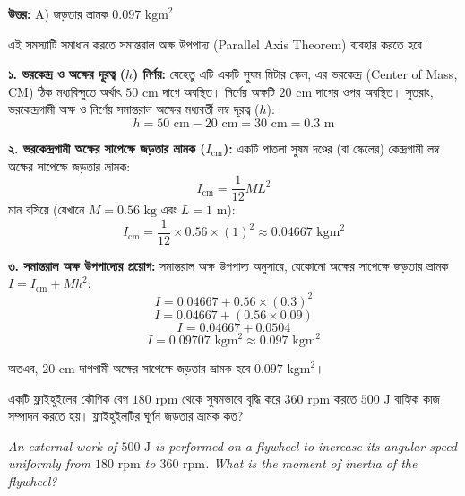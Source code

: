\documentclass[12pt, a4paper]{article}
\begin{document}
\vspace{0.5em}
\begin{tcolorbox}[answerbox]
\textbf{\color{success} উত্তর:} A) জড়তার ভ্রামক $0.097\text{ kgm}^2$
\end{tcolorbox}
\vspace{1em}

\begin{tcolorbox}[solutionbox={সমাধান (Solution)}]
\noindent
এই সমস্যাটি সমাধান করতে সমান্তরাল অক্ষ উপপাদ্য (Parallel Axis Theorem) ব্যবহার করতে হবে।

\vspace{0.5em}
\textbf{১. ভরকেন্দ্র ও অক্ষের দূরত্ব ($h$) নির্ণয়:}
যেহেতু এটি একটি সুষম মিটার স্কেল, এর ভরকেন্দ্র (Center of Mass, CM) ঠিক মধ্যবিন্দুতে অর্থাৎ $50\text{ cm}$ দাগে অবস্থিত। 
নির্ণেয় অক্ষটি $20\text{ cm}$ দাগের ওপর অবস্থিত। সুতরাং, ভরকেন্দ্রগামী অক্ষ ও নির্ণেয় সমান্তরাল অক্ষের মধ্যবর্তী লম্ব দূরত্ব ($h$):
$$h = 50\text{ cm} - 20\text{ cm} = 30\text{ cm} = 0.3\text{ m}$$

\vspace{0.5em}
\textbf{২. ভরকেন্দ্রগামী অক্ষের সাপেক্ষে জড়তার ভ্রামক ($I_{\text{cm}}$):}
একটি পাতলা সুষম দণ্ডের (বা স্কেলের) কেন্দ্রগামী লম্ব অক্ষের সাপেক্ষে জড়তার ভ্রামক:
$$I_{\text{cm}} = \frac{1}{12} M L^2$$
মান বসিয়ে (যেখানে $M = 0.56\text{ kg}$ এবং $L = 1\text{ m}$):
$$I_{\text{cm}} = \frac{1}{12} \times 0.56 \times (1)^2 \approx 0.04667\text{ kgm}^2$$

\vspace{0.5em}
\textbf{৩. সমান্তরাল অক্ষ উপপাদ্যের প্রয়োগ:}
সমান্তরাল অক্ষ উপপাদ্য অনুসারে, যেকোনো অক্ষের সাপেক্ষে জড়তার ভ্রামক $I = I_{\text{cm}} + M h^2$:
$$I = 0.04667 + 0.56 \times (0.3)^2$$
$$I = 0.04667 + (0.56 \times 0.09)$$
$$I = 0.04667 + 0.0504$$
$$I = 0.09707\text{ kgm}^2 \approx 0.097\text{ kgm}^2$$

অতএব, $20\text{ cm}$ দাগগামী অক্ষের সাপেক্ষে জড়তার ভ্রামক হবে $0.097\text{ kgm}^2$।
\end{tcolorbox}
\vspace{1em}
\begin{tcolorbox}[questionbox={প্রশ্ন (Question) 27}]
\noindent
একটি ফ্লাইহুইলের কৌণিক বেগ $180\text{ rpm}$ থেকে সুষমভাবে বৃদ্ধি করে $360\text{ rpm}$ করতে $500\text{ J}$ বাহ্যিক কাজ সম্পাদন করতে হয়। ফ্লাইহুইলটির ঘূর্ণন জড়তার ভ্রামক কত?

\vspace{0.8em}
\begin{english}
\noindent\textit{\color{darkgray}
An external work of $500\text{ J}$ is performed on a flywheel to increase its angular speed uniformly from $180\text{ rpm}$ to $360\text{ rpm}$. What is the moment of inertia of the flywheel?
}
\end{english}
\end{tcolorbox}
\end{document}
